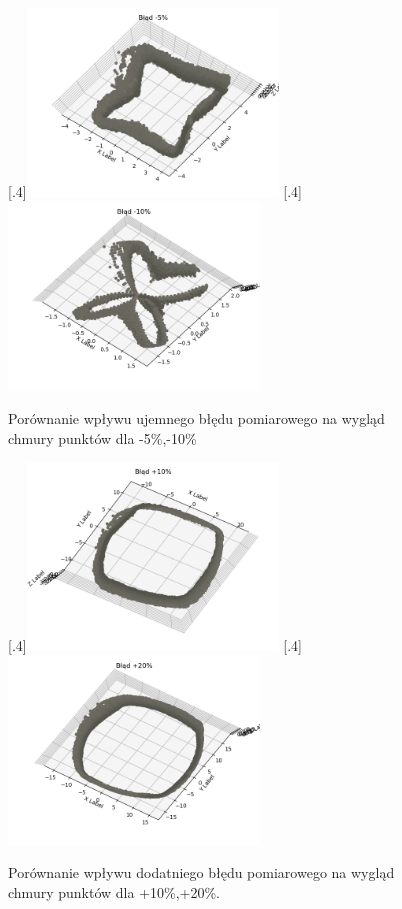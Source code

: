 \begin{figure}[H]
\centering
{}%
  [.4\linewidth]{\includegraphics[height=5cm]{blad_minus5.png}}
  [.4\linewidth]{\includegraphics[height=5cm]{blad_minus10.png}}
\caption{Porównanie wpływu ujemnego błędu pomiarowego na wygląd chmury punktów dla -5\%,-10\%}\label{fig:depthErrorImageMinus}
\end{figure}

\begin{figure}[H]
\centering
{}%
  [.4\linewidth]{\includegraphics[height=5cm]{blad_plus10.png}}
  [.4\linewidth]{\includegraphics[height=5cm]{blad_plus20.png}}
\caption{Porównanie wpływu dodatniego błędu pomiarowego na wygląd chmury punktów dla +10\%,+20\%.}\label{fig:depthErrorImagePlus}
\end{figure}

